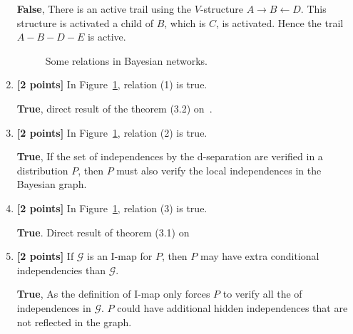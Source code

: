 \documentclass[12pt]{article} \usepackage[utf8]{inputenc}
\newcommand{\Gcal}{\mathcal{G}}
\newcommand{\Ical}{\mathcal{I}}
\begin{document}
\begin{enumerate}
\begin{solution}
 \textbf{False}, There is an active trail using the $V$-structure
 $A\rightarrow B \leftarrow D$.
 This structure is activated a child of $B$, which is $C$, is activated.
 Hence the trail $A-B-D-E$ is active.
\end{solution}



\begin{figure}[h]
\centering
{}
\caption{Some relations in Bayesian networks.}
\label{fig:relations-bayesnet}
\end{figure}



\item \textbf{[2 points]} In Figure~\ref{fig:relations-bayesnet}, relation (1) is true.

\begin{solution}
  \textbf{True}, direct result of  the theorem (3.2) on~\cite{koller2009probabilistic}.
\end{solution}
\item \textbf{[2 points]} In Figure~\ref{fig:relations-bayesnet}, relation (2) is true.

\begin{solution}
  \textbf{True}, If the set of independences by the d-separation are
  verified in a distribution $P$, then $P$ must also verify the local
  independences in the Bayesian graph.
\end{solution}
\item \textbf{[2 points]} In Figure~\ref{fig:relations-bayesnet}, relation (3) is true.

\begin{solution}
  \textbf{True}. Direct result of theorem (3.1)
  on~\cite{koller2009probabilistic}
\end{solution}

\item \textbf{[2 points]} If $ \Gcal $ is an I-map for $ P $, then $ P $ may have extra conditional independencies than $ \Gcal $.


\begin{solution}
  \textbf{True}, As the definition of I-map only forces $P$ to verify all the
  of independences in $\Gcal$. $P$ could have additional hidden
  independences that are not reflected in the graph.
\end{solution}


\end{enumerate}
\end{document}
